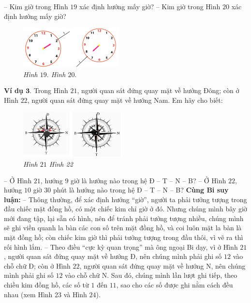 	\vskip 0.05cm
	-- Kim giờ trong Hình $19$ xác định hướng  mấy giờ?
	\vskip 0.05cm
	-- Kim giờ trong Hình $20$ xác định hướng  mấy giờ?
		\begin{figure}[H]
		\centering
		\vspace*{-5pt}
		\captionsetup{labelformat= empty, justification=centering}
		\includegraphics[width=0.465\textwidth]{pic17}
		\caption{\small\textit{Hình $19.$ \hspace*{80pt} Hình $20.$}}
		\vspace*{-10pt}
	\end{figure}
	\textbf{Ví dụ $\pmb3.$} Trong Hình $21$, người quan sát đứng quay mặt về hướng Đông; còn ở Hình $22$, người quan sát đứng quay mặt về hướng Nam. Em hãy cho biết:
			\begin{figure}[H]
		\centering
		\vspace*{-5pt}
		\captionsetup{labelformat= empty, justification=centering}
		\includegraphics[width=0.48\textwidth]{pic18}
		\caption{\small\textit{Hình $21$ \hspace*{80pt} Hình 22}}
		\vspace*{-5pt}
	\end{figure}
	-- Ở Hình $21$, hướng $9$ giờ là hướng nào trong hệ Đ -- T -- N -- B?
	\vskip 0.05cm
	-- Ở Hình $22$, hướng $10$ giờ $30$ phút là hướng nào trong hệ Đ -- T -- N -- B?
	\vskip 0.05cm
	\textbf{Cùng Bi suy luận:}
	\vskip 0.1cm
	-- Thông thường, để xác định hướng “giờ”, người ta phải tưởng tượng trong đầu chiếc mặt đồng hồ, có một chiếc kim chỉ giờ ở đó. Nhưng chúng mình bây giờ mới đang tập, lại sẵn có hình, nên để tránh phải tưởng tượng nhiều, chúng mình sẽ ghi viền quanh la bàn các con số trên mặt đồng hồ, và coi luôn mặt la bàn là mặt đồng hồ; còn chiếc kim giờ thì phải tưởng tượng trong đầu thôi, vì vẽ ra thì rối hình lắm.
	\vskip 0.1cm
	-- Theo điều “cực kỳ quan trọng” mà ông ngoại Bi dạy, vì ở Hình $21$, người quan sát đứng quay mặt về hướng Đ, nên chúng mình phải ghi số $12$ vào chỗ chữ Đ; còn ở Hình $22$, người quan sát đứng quay mặt về hướng N, nên chúng mình phải ghi số $12$ vào chỗ chữ N. Sau đó, chúng mình lần lượt ghi tiếp, theo chiều kim đồng hồ, các số từ $1$ đến $11$, sao cho các số được ghi nằm cách đều nhau (xem Hình $23$ và Hình $24$).
